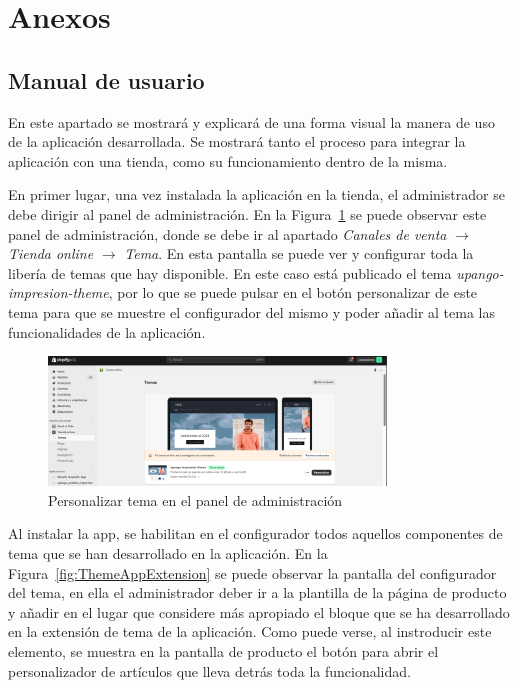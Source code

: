 \documentclass[12pt]{article}
\begin{document}
\clearpage
\section{Anexos}

\subsection{Manual de usuario}
En este apartado se mostrará y explicará de una forma visual la manera de uso de la aplicación desarrollada. Se mostrará tanto el proceso para integrar la aplicación con una tienda, como
su funcionamiento dentro de la misma.

En primer lugar, una vez instalada la aplicación en la tienda, el administrador se debe dirigir al panel de administración. En la Figura~\ref{fig:PersonalizarTema} se puede observar este panel de administración, donde
se debe ir al apartado \textit{Canales de venta} $\rightarrow$  \textit{Tienda online} $\rightarrow$  \textit{Tema}. En esta pantalla se puede ver y configurar toda la libería de temas que hay disponible.
En este caso está publicado el tema \textit{upango-impresion-theme}, por lo que se puede pulsar en el botón personalizar de este tema para que se muestre el configurador del mismo y poder
añadir al tema las funcionalidades de la aplicación.

\begin{figure}[ht]
    \centering
    \includegraphics[width=0.8\textwidth]{imagenes/ManualUsuario/PantallaDePersonalizarTema.png}
    \caption{\label{fig:PersonalizarTema}Personalizar tema en el panel de administración}
    \vspace{\fill}
\end{figure}

Al instalar la app, se habilitan en el configurador todos aquellos componentes de tema que se han desarrollado en la aplicación.
En la Figura~\ref{fig:ThemeAppExtension} se puede observar la pantalla del configurador del tema, en ella el administrador deber ir a la plantilla de la página de producto y añadir
en el lugar que considere más apropiado el bloque que se ha desarrollado en la extensión de tema de la aplicación. Como puede verse, al instroducir este elemento, se muestra en la pantalla de producto
el botón para abrir el personalizador de artículos que lleva detrás toda la funcionalidad.
\end{document}

